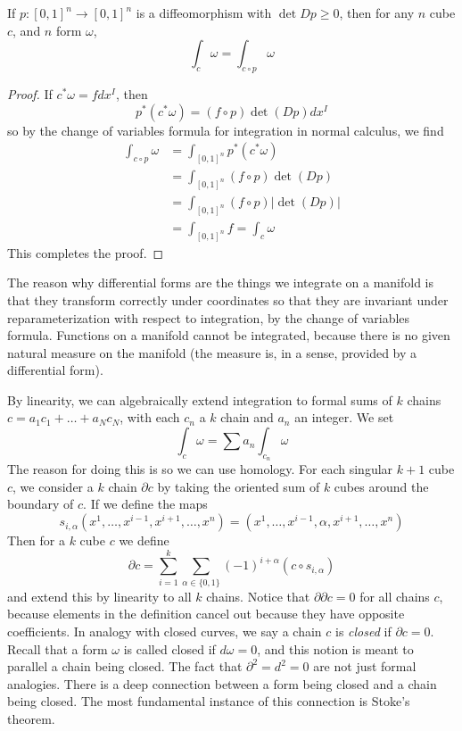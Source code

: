 \begin{theorem}
    If $p: [0,1]^n \to [0,1]^n$ is a diffeomorphism with $\det Dp \geq 0$, then for any $n$ cube $c$, and $n$ form $\omega$,
    \[ \int_c \omega = \int_{c \circ p} \omega \]
\end{theorem}
\begin{proof}
    If $c^* \omega = f dx^I$, then
    \[ p^*(c^* \omega) = (f \circ p) \det(Dp) dx^I \] 
    so by the change of variables formula for integration in normal calculus, we find
    \begin{align*}
        \int_{c \circ p} \omega &= \int_{[0,1]^n} p^*(c^* \omega)\\
        &= \int_{[0,1]^n} (f \circ p) \det(Dp)\\
        &= \int_{[0,1]^n} (f \circ p) |\det(Dp)|\\
        &= \int_{[0,1]^n} f = \int_c \omega
    \end{align*}
    This completes the proof.
\end{proof}

The reason why differential forms are the things we integrate on a manifold is that they transform correctly under coordinates so that they are invariant under reparameterization with respect to integration, by the change of variables formula. Functions on a manifold cannot be integrated, because there is no given natural measure on the manifold (the measure is, in a sense, provided by a differential form).

By linearity, we can algebraically extend integration to formal sums of $k$ chains $c = a_1 c_1 + \dots + a_N c_N$, with each $c_n$ a $k$ chain and $a_n$ an integer. We set
%
\[ \int_c \omega = \sum a_n \int_{c_n} \omega \]
%
The reason for doing this is so we can use homology. For each singular $k+1$ cube $c$, we consider a $k$ chain $\partial c$ by taking the oriented sum of $k$ cubes around the boundary of $c$. If we define the maps
%
\[ s_{i,\alpha}(x^1, \dots, x^{i-1}, x^{i+1}, \dots, x^n) = (x^1, \dots, x^{i-1}, \alpha, x^{i+1}, \dots, x^n) \]
%
Then for a $k$ cube $c$ we define
%
\[ \partial c = \sum_{i = 1}^k \sum_{\alpha \in \{ 0, 1 \}} (-1)^{i + \alpha} (c \circ s_{i,\alpha}) \]
%
and extend this by linearity to all $k$ chains. Notice that $\partial \partial c = 0$ for all chains $c$, because elements in the definition cancel out because they have opposite coefficients. In analogy with closed curves, we say a chain $c$ is \emph{closed} if $\partial c = 0$. Recall that a form $\omega$ is called closed if $d\omega = 0$, and this notion is meant to parallel a chain being closed. The fact that $\partial^2 = d^2 = 0$ are not just formal analogies. There is a deep connection between a form being closed and a chain being closed. The most fundamental instance of this connection is Stoke's theorem.

